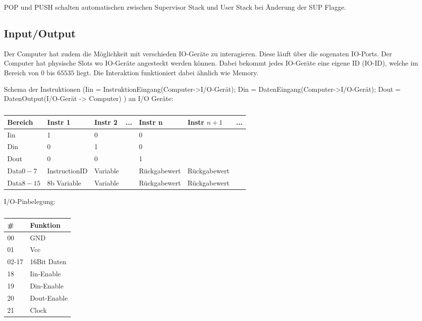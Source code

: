 \documentclass{scrartcl}
\begin{document}
POP und PUSH schalten automatischen zwischen Supervisor Stack und User Stack bei Änderung der SUP Flagge.

\subsection{\label{section:io}Input/Output}

Der Computer hat zudem die Möglichkeit mit verschieden IO-Geräte zu interagieren. Diese läuft über die sogenaten IO-Ports.
Der Computer hat physische Slots wo IO-Geräte angesteckt werden können.
Dabei bekommt jedes IO-Geräte eine eigene ID (IO-ID), welche im Bereich von $0$ bis $65535$ liegt.
Die Interaktion funktioniert dabei ähnlich wie Memory.


Schema der Instruktionen (Iin = InstruktionEingang(Computer->I/O-Gerät); Din = DatenEingang(Computer->I/O-Gerät); Dout = DatenOutput(I/O-Gerät -> Computer) ) an I/O Geräte:

\begin{center}
	\begin{table}[h]
		\caption{\label{table:IO_Schem}}
		\begin{tabular}{l | l | l | l | l | l | l}
			 Bereich & Instr 1 & Instr 2 & ... & Instr n & Instr $n+1$ & ... \\
			\hline
			Iin & 1 & 0 &   & 0 & \\
			Din & 0 & 1 &   & 0 & \\
			Dout & 0 & 0 &   & 1 & \\
			Data$0-7$ & InstructionID & Variable &   & Rückgabewert & Rückgabewert \\
			Data$8-15$ & 8b Variable & Variable &   & Rückgabewert & Rückgabewert
 		\end{tabular}
	\end{table}
\end{center}


I/O-Pinbelegung:
\begin{center}
	\begin{table}[h]
		\caption{\label{table:IOPins}}
		\begin{tabular}{l | l}
			# & Funktion \\
			\hline
			00 & GND \\
			01 & Vcc \\
			02-17 & 16Bit Daten \\
			18 & Iin-Enable \\
			19 & Din-Enable \\
			20 & Dout-Enable \\
			21 & Clock
 		\end{tabular}
	\end{table}
\end{center}
\end{document}
